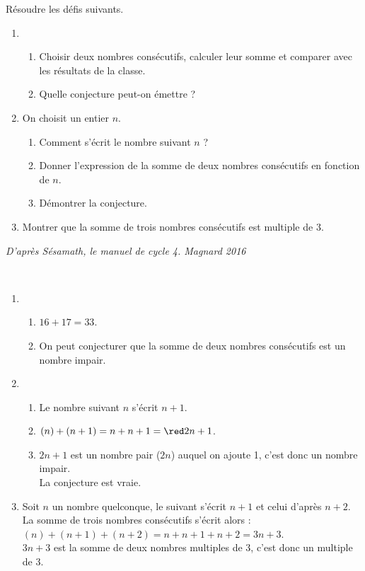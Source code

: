 \begin{exercice}
    Résoudre les défis suivants.
    \begin{enumerate}
       \item
          \begin{enumerate}
             \item Choisir deux nombres consécutifs, calculer leur somme et comparer avec les résultats de la classe.
             \item Quelle conjecture peut-on émettre ?
          \end{enumerate}
       \item On choisit un entier $n$.
          \begin{enumerate}
             \item Comment s'écrit le nombre suivant $n$ ?
             \item Donner l'expression de la somme de deux nombres consécutifs en fonction de $n$.
             \item Démontrer la conjecture.
          \end{enumerate}
       \item Montrer que la somme de trois nombres consécutifs est multiple de 3.
    \end{enumerate}
    \phantom{rrr}\hfill\footnotesize\it D'après Sésamath, le manuel de cycle 4. Magnard 2016
 \end{exercice}
 
 \begin{corrige}
 \ \\ [-5mm]
    \begin{enumerate}
       \item
          \begin{enumerate}
             \item {\red $16+17 =33$}.
             \item On peut conjecturer que  {\red la somme de deux nombres consécutifs est un nombre impair}.
          \end{enumerate}
       \setcounter{enumi}{1}
       \item
          \begin{enumerate}
             \item Le nombre suivant $n$ s'écrit {\red $n+1$}.
             \item $(n)+(n+1) =n+n+1 ={\red 2n+1}$.
             \item $2n+1$ est un nombre pair ($2n$) auquel on ajoute 1, c'est donc un nombre impair. \\
                {\red La conjecture est vraie}.
          \end{enumerate}
       \setcounter{enumi}{2}
       \item Soit $n$ un nombre quelconque, le suivant s'écrit $n+1$ et celui d'après $n+2$. \\
          La somme de trois nombres consécutifs s'écrit alors : \\
          $(n)+(n+1)+(n+2) =n+n+1+n+2 =3n+3$. \\
          $3n+3$ est la somme de deux nombres multiples de 3, {\red c'est donc un multiple de 3}.
    \end{enumerate}
 \end{corrige}   
 